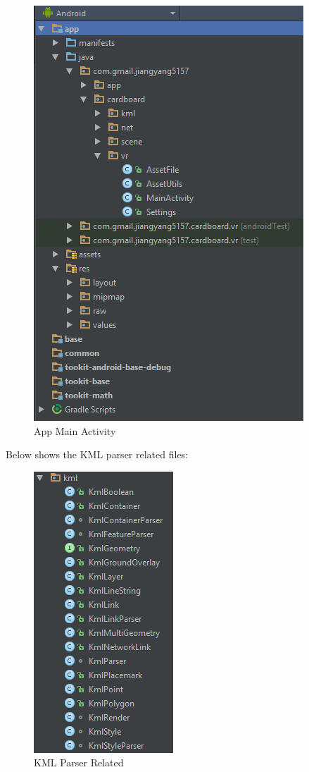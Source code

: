 \begin{figure}[H]
\caption{App Main Activity}
\label{fig:app-main-activity}
\centering
\includegraphics[]{Figures/app-main-activity.png}
\decoRule
\end{figure}

Below shows the KML parser related files:

\begin{figure}[H]
\caption{KML Parser Related}
\label{fig:files-kml}
\centering
\includegraphics[]{Figures/files-kml.png}
\decoRule
\end{figure}

